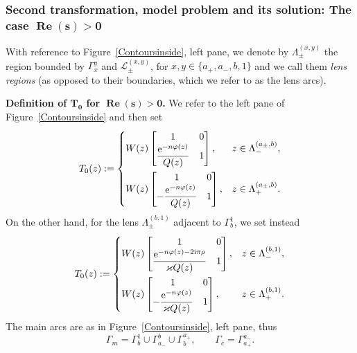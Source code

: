 \documentclass[pdftex]{sigma}
\numberwithin{equation}{section}
\theoremstyle{definition}
\def \scr{\mathscr}
\def \ds{\displaystyle}
\def\be{\begin{equation}}
\def\ee{\end{equation}}
\def \Re{\operatorname{Re} }
\begin{document}
\subsubsection[Second transformation, model problem and its solution: The case $\Re(s)>0$]{Second transformation, model problem and its solution: The case $\boldsymbol{\Re(s)>0}$}
\label{secmodels>0}

 With reference to Figure~\ref{Contoursinside}, left pane, we denote by $\Lambda_{\pm}^{(x,y)}$ the region bounded by $\Gamma_x^y$ and $\scr L_\pm^{(x,y)}$, for $x,y\in \{a_+,a_-,b,1\}$ and we call them {\it lens regions} (as opposed to their boundaries, which we refer to as the lens arcs).

{\bf Definition of $\boldsymbol{T_0}$ for $\boldsymbol{\Re(s)>0}$.}
We refer to the left pane of Figure~\ref{Contoursinside} and then set
\[
T_0(z):=
\begin{cases}
\ds W(z) \begin{bmatrix}
1 & 0 \\
\displaystyle\frac{ {\rm e}^{-n\varphi(z)}}{ Q(z)} & 1
\end{bmatrix},& z\in \Lambda_-^{(a_\pm,b)},
\vspace{1mm}\\
W(z) \begin{bmatrix}
1 & 0 \\
\displaystyle-\frac{ {\rm e}^{-n\varphi(z)}}{ Q(z)} & 1
\end{bmatrix},& z\in \Lambda_+^{(a_\pm,b)}.
\end{cases}
\]
 On the other hand, for the lens $\Lambda_\pm^{(b,1)}$ adjacent to $\Gamma_b^1$, we set instead
\be
\label{defTb1}
T_0(z):=
\begin{cases}
\ds W(z) \begin{bmatrix}
1 & 0 \\
\displaystyle\frac{ {\rm e}^{-n\varphi(z)-2{\rm i}\pi { {\rho}}}}{\varkappa Q(z)} & 1
\end{bmatrix},& z\in \Lambda_-^{(b,1)},
\vspace{1mm}\\
W(z) \begin{bmatrix}
1 & 0 \\
\displaystyle-\frac{ {\rm e}^{-n\varphi(z)}}{\varkappa Q(z)} & 1
\end{bmatrix}, & z\in \Lambda_+^{(b,1)}.
\end{cases}
\ee
The main arcs are as in Figure~\ref{Contoursinside}, left pane, thus
\[
\Gamma_m = \Gamma_b^1 \cup \Gamma_{a_-}^b \cup \Gamma_{b}^{a_+}, \qquad
\Gamma_c = \Gamma_{a_+}^{a_-}.
\]
\end{document}
